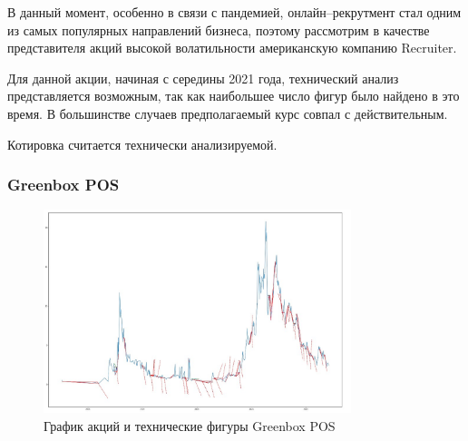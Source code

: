 \documentclass[bachelor, och, coursework]{SCWorks}
\begin{document}
    В данный момент, особенно в связи с пандемией, онлайн--рекрутмент
    стал одним из самых популярных направлений бизнеса, поэтому рассмотрим в 
    качестве представителя акций высокой волатильности американскую компанию
    Recruiter.

    Для данной акции, начиная с середины 2021 года, технический анализ представляется
    возможным, так как наибольшее число фигур было найдено в это время. В большинстве
    случаев предполагаемый курс совпал с действительным.
    
    Котировка считается технически анализируемой.

    \subsubsection{Greenbox POS}
    
    \begin{figure}[H]
        \centering
        \includegraphics[width=0.8\textwidth]{pic/GBOX.jpg}
        \caption{График акций и технические фигуры Greenbox POS}
    \end{figure}
   
\end{document}
